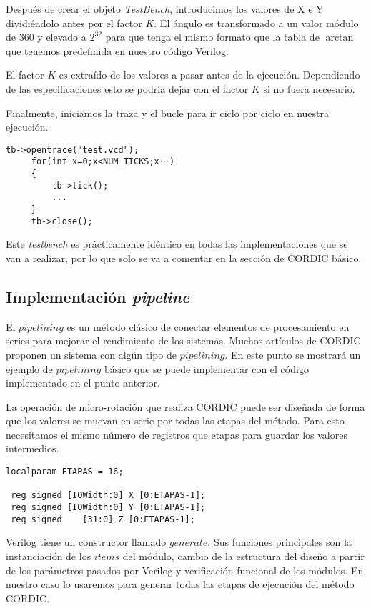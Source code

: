 Después de crear el objeto \textit{TestBench}, introducimos los valores de X e Y  dividiéndolo antes por el factor $K$. El ángulo es transformado a un valor módulo de 360 y elevado a $2^{32}$ para que tenga el mismo formato que la tabla de $\arctan$ que tenemos predefinida en nuestro código Verilog.

El factor $K$ es extraído de los valores a pasar antes de la ejecución. Dependiendo de las especificaciones esto se podría dejar con el factor $K$ si no fuera necesario.

Finalmente, iniciamos la traza y el bucle para ir ciclo por ciclo en nuestra ejecución.

\begin{lstlisting}[caption={Bucle principal de main.cpp}]
     tb->opentrace("test.vcd");
     for(int x=0;x<NUM_TICKS;x++)
     {
         tb->tick();
         ...
     }
     tb->close();
\end{lstlisting}

Este \textit{testbench} es prácticamente idéntico en todas las implementaciones que se van a realizar, por lo que solo se va a comentar en la sección de CORDIC básico.

\subsection{Implementación \textit{pipeline}}
El $pipelining$ es un método clásico de conectar elementos de procesamiento en series para  mejorar el rendimiento de los sistemas. Muchos artículos de CORDIC proponen un sistema con algún tipo de $pipelining$. En este punto se mostrará un ejemplo de $pipelining$ básico que se puede implementar con el código implementado en el punto anterior.

La operación de micro-rotación que realiza CORDIC puede ser diseñada de forma que los valores se muevan en serie por todas las etapas del método. Para esto necesitamos el mismo número de registros que etapas para guardar los valores intermedios.

\begin{lstlisting}[caption={Registros de CORDIC ampliados para \textit{pipelining}}]
localparam ETAPAS = 16;

 reg signed [IOWidth:0] X [0:ETAPAS-1];
 reg signed [IOWidth:0] Y [0:ETAPAS-1];
 reg signed    [31:0] Z [0:ETAPAS-1];

\end{lstlisting}

Verilog tiene un constructor llamado $generate$. Sus funciones principales son la instanciación de los $items$ del módulo, cambio de la estructura del diseño a partir de los parámetros pasados por Verilog y verificación funcional de los módulos. En nuestro caso lo usaremos para generar todas las etapas de ejecución del método CORDIC.

